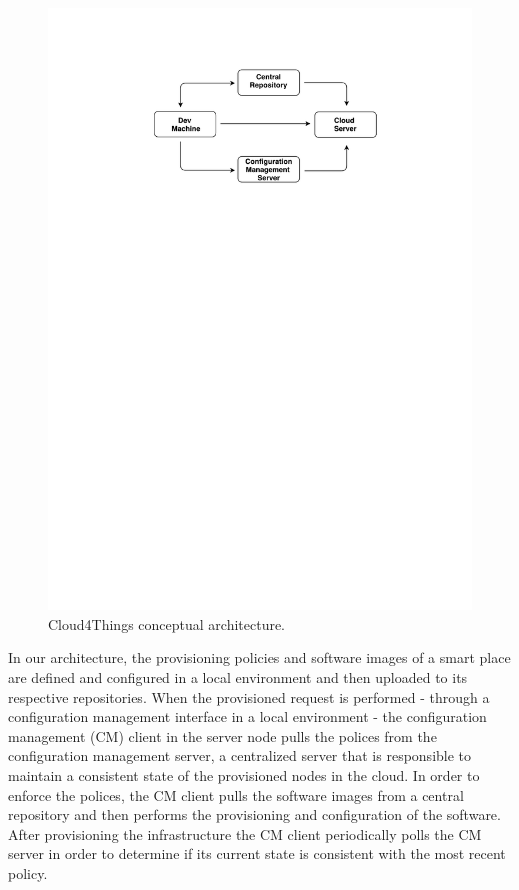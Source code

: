 \begin{figure}[ht!]
  \centering
  \includegraphics[width=.7\textwidth]{images/c4t-generic-solution.pdf}
  \caption{Cloud4Things conceptual architecture.}
  \label{fig:c4t_generic_solution}
\end{figure}

In our architecture, the provisioning policies and software images of a smart place are defined and
configured in a local environment and then uploaded to its respective repositories. When the provisioned
request is performed - through a configuration management interface in a local environment - the
configuration management (CM) client in the server node pulls the polices from the configuration
management server, a centralized server that is responsible to maintain a consistent state of the
provisioned nodes in the cloud. In order to enforce the polices, the CM client pulls the software
images from a central repository and then performs the provisioning and configuration of the software.
After provisioning the infrastructure the CM client periodically polls the CM server in order to
determine if its current state is consistent with the most recent policy.
